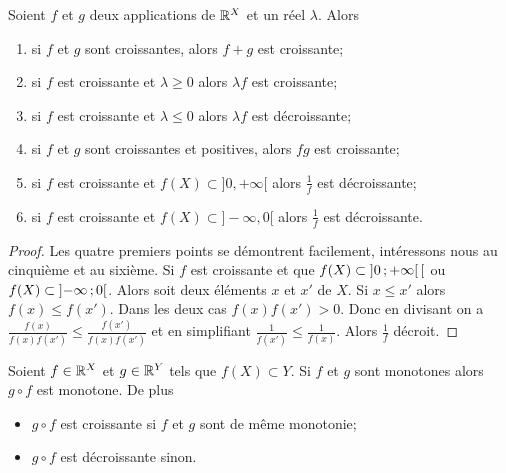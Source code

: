 \begin{prop}
  Soient $f$ et $g$ deux applications de $\mathbb{R}^X$ et un réel $\lambda$. Alors
  \begin{enumerate}
  \item si $f$ et $g$ sont croissantes, alors $f+g$ est croissante;
  \item si $f$ est croissante et $\lambda \geq 0$ alors $\lambda f$ est croissante;
  \item si $f$ est croissante et $\lambda \leq 0$ alors $\lambda f$ est décroissante;
  \item si $f$ et $g$ sont croissantes et positives, alors $fg$ est croissante;
  \item si $f$ est croissante et $f(X)\subset ]0,+\infty[$ alors $\frac{1}{f}$ est décroissante;
  \item si $f$ est croissante et $f(X)\subset ]-\infty, 0[$ alors $\frac{1}{f}$ est décroissante.
  \end{enumerate}
\end{prop}
\begin{proof}
  Les quatre premiers points se démontrent facilement, intéressons nous au cinquième et au sixième. Si $f$ est croissante et que $f(X)\subset \left] 0 \, ;  +\infty \right[[$ ou $f(X)\subset \left] -\infty \, ;  0 \right[$. Alors soit deux éléments $x$ et $x'$ de $X$. Si $x \leq x'$  alors $f(x) \leq f(x')$. Dans les deux cas $f(x)f(x') > 0$. Donc en divisant on a $\frac{f(x)}{f(x)f(x')} \leq \frac{f(x')}{f(x)f(x')}$ et en simplifiant $\frac{1}{f(x')} \leq \frac{1}{f(x)}$. Alors $\frac{1}{f}$ décroit.
\end{proof}
\begin{theo}
  Soient $f \in \mathbb{R}^X$ et $g \in \mathbb{R}^Y$ tels que $f(X) \subset Y$. Si $f$ et $g$ sont monotones alors $g \circ f$ est monotone. De plus
  \begin{itemize}
  \item $g \circ f$ est croissante si $f$ et $g$ sont de même monotonie;
  \item $g \circ f$ est décroissante sinon.
  \end{itemize}
\end{theo}

